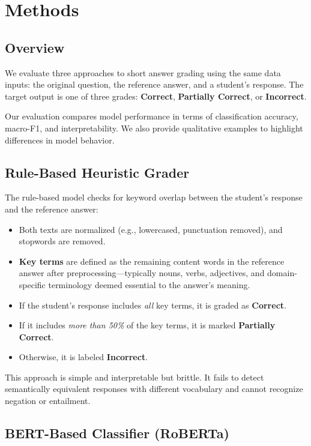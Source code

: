 \documentclass[11pt]{article}
\begin{document}
\section{Methods}
\subsection{Overview}
We evaluate three approaches to short answer grading using the same data inputs: the original question, the reference answer, and a student’s response. The target output is one of three grades: \textbf{Correct}, \textbf{Partially Correct}, or \textbf{Incorrect}.

Our evaluation compares model performance in terms of classification accuracy, macro-F1, and interpretability. We also provide qualitative examples to highlight differences in model behavior.

\subsection{Rule-Based Heuristic Grader}
The rule-based model checks for keyword overlap between the student’s response and the reference answer:

\begin{itemize}
    \item Both texts are normalized (e.g., lowercased, punctuation removed), and stopwords are removed.
    \item \textbf{Key terms} are defined as the remaining content words in the reference answer after preprocessing—typically nouns, verbs, adjectives, and domain-specific terminology deemed essential to the answer's meaning.
    \item If the student’s response includes \emph{all} key terms, it is graded as \textbf{Correct}.
    \item If it includes \emph{more than 50\%} of the key terms, it is marked \textbf{Partially Correct}.
    \item Otherwise, it is labeled \textbf{Incorrect}.
\end{itemize}


This approach is simple and interpretable but brittle. It fails to detect semantically equivalent responses with different vocabulary and cannot recognize negation or entailment.

\subsection{BERT-Based Classifier (RoBERTa)}
\end{document}

